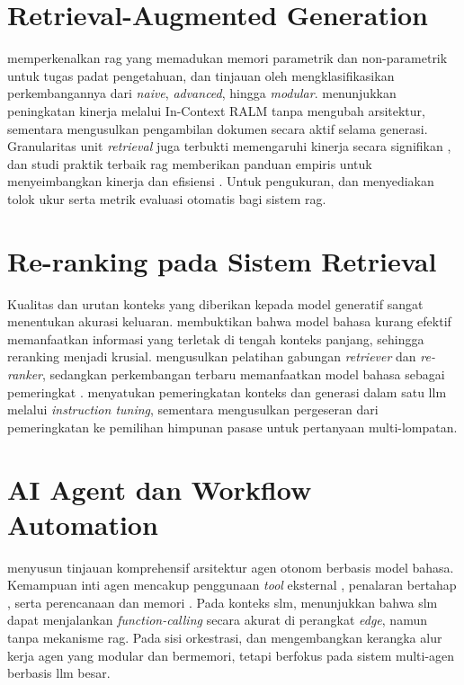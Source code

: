 \section{Retrieval-Augmented Generation}
\citet{lewis2020rag} memperkenalkan \gls{rag} yang memadukan memori parametrik dan non-parametrik untuk tugas padat pengetahuan, dan tinjauan oleh \citet{gao2023ragsurvey} mengklasifikasikan perkembangannya dari \textit{naive}, \textit{advanced}, hingga \textit{modular}. \citet{ram2023incontext} menunjukkan peningkatan kinerja melalui In-Context RALM tanpa mengubah arsitektur, sementara \citet{jiang2023activerag} mengusulkan pengambilan dokumen secara aktif selama generasi. Granularitas unit \textit{retrieval} juga terbukti memengaruhi kinerja secara signifikan \citep{chen2024densex}, dan studi praktik terbaik \gls{rag} memberikan panduan empiris untuk menyeimbangkan kinerja dan efisiensi \citep{wang2024ragbestpractices}. Untuk pengukuran, \citet{chen2024ragbench} dan \citet{es2024ragas} menyediakan tolok ukur serta metrik evaluasi otomatis bagi sistem \gls{rag}.

\section{Re-ranking pada Sistem Retrieval}
Kualitas dan urutan konteks yang diberikan kepada model generatif sangat menentukan akurasi keluaran. \citet{liu2024lostmiddle} membuktikan bahwa model bahasa kurang efektif memanfaatkan informasi yang terletak di tengah konteks panjang, sehingga \gls{reranking} menjadi krusial. \citet{ren2021rocketqav2} mengusulkan pelatihan gabungan \textit{retriever} dan \textit{re-ranker}, sedangkan perkembangan terbaru memanfaatkan model bahasa sebagai pemeringkat \citep{sun2023rankgpt, ma2023lrl, pradeep2023rankvicuna}. \citet{yu2024rankrag} menyatukan pemeringkatan konteks dan generasi dalam satu \gls{llm} melalui \textit{instruction tuning}, sementara \citet{lee2025setr} mengusulkan pergeseran dari pemeringkatan ke pemilihan himpunan pasase untuk pertanyaan multi-lompatan.

\section{AI Agent dan Workflow Automation}
\citet{wang2024agentsurvey} menyusun tinjauan komprehensif arsitektur agen otonom berbasis model bahasa. Kemampuan inti agen mencakup penggunaan \textit{tool} eksternal \citep{schick2023toolformer}, penalaran bertahap \citep{yao2023tot}, serta perencanaan dan memori \citep{park2023generativeagents}. Pada konteks \gls{slm}, \citet{erdogan2024tinyagent} menunjukkan bahwa \gls{slm} dapat menjalankan \textit{function-calling} secara akurat di perangkat \textit{edge}, namun tanpa mekanisme \gls{rag}. Pada sisi orkestrasi, \citet{niu2025flow} dan \citet{han2026legomem} mengembangkan kerangka alur kerja agen yang modular dan bermemori, tetapi berfokus pada sistem multi-agen berbasis \gls{llm} besar.


